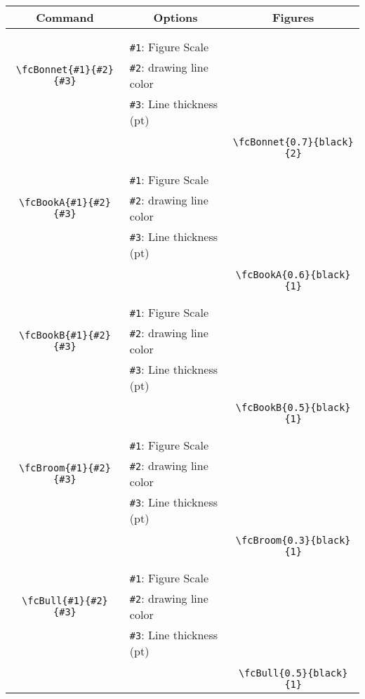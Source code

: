 \documentclass{article}
\begin{document}
\begin{table}[H]\centering\begin{tabular}{|c|l|c|}\hline {\bf Command}& \multicolumn{1}{c|}{{\bf Options}} & {\bf Figures}\\  \hline	&&\multirow{5}{*}{\fcBonnet{0.7}{black}{2}}\\	&&\\	&\verb|#1|: Figure Scale &\\	\verb|\fcBonnet{#1}{#2}{#3}|&	\verb|#2|: drawing line color &\\	&\verb|#3|: Line thickness (pt) &\\ &&\\&&	\verb|\fcBonnet{0.7}{black}{2}|\\\hline 	
	&&\multirow{5}{*}{\fcBookA{0.6}{black}{1}}\\	&&\\	&\verb|#1|: Figure Scale &\\	\verb|\fcBookA{#1}{#2}{#3}|&	\verb|#2|: drawing line color &\\	&\verb|#3|: Line thickness (pt) &\\ &&\\&&	\verb|\fcBookA{0.6}{black}{1}|\\\hline 	
	&&\multirow{5}{*}{\fcBookB{0.5}{black}{1}}\\	&&\\	&\verb|#1|: Figure Scale &\\	\verb|\fcBookB{#1}{#2}{#3}|&	\verb|#2|: drawing line color &\\	&\verb|#3|: Line thickness (pt) &\\ &&\\&&	\verb|\fcBookB{0.5}{black}{1}|\\\hline 	
	&&\multirow{5}{*}{\fcBroom{0.3}{black}{1}}\\	&&\\	&\verb|#1|: Figure Scale &\\	\verb|\fcBroom{#1}{#2}{#3}|&	\verb|#2|: drawing line color &\\	&\verb|#3|: Line thickness (pt) &\\ &&\\&&	\verb|\fcBroom{0.3}{black}{1}|\\\hline 	
	&&\multirow{5}{*}{\fcBull{0.5}{black}{1}}\\	&&\\	&\verb|#1|: Figure Scale &\\	\verb|\fcBull{#1}{#2}{#3}|&	\verb|#2|: drawing line color &\\	&\verb|#3|: Line thickness (pt) &\\ &&\\&&	\verb|\fcBull{0.5}{black}{1}|\\\hline 	

\end{tabular}
\end{table}
\end{document}

